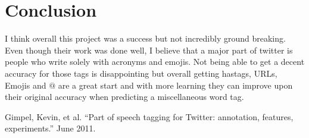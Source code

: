 \documentclass[journal, a4paper]{IEEEtran}
\begin{document}
\section{Conclusion}
	I think overall this project was a success but not incredibly ground breaking. Even though their work was done well, I believe that a major part of twitter is people who write solely with acronyms and emojis. Not being able to get a decent accuracy for those tags is disappointing but overall getting hastags, URLs, Emojis and $@$ are a great start and with more learning they can improve upon their original accuracy when predicting a miscellaneous word tag.
\begin{thebibliography}{5}

	Gimpel, Kevin, et al. “Part of speech tagging for Twitter: annotation, features, experiments.” June 2011.
\end{thebibliography}
\end{document}

